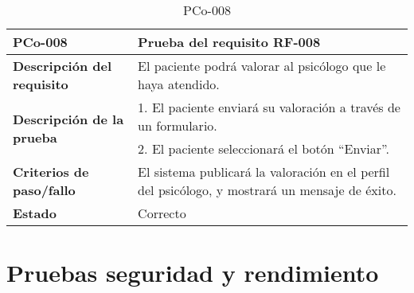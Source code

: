 \begin{table}[htpb]
\centering
\begin{tabularx}{\textwidth}{|l|X|}
\hline
\rowcolor[gray]{0.9}\textbf{PCo-008}                                     & \textbf{Prueba del requisito RF-008}                                                           \\ \hline
\textbf{Descripción del requisito}                 & El paciente podrá valorar al psicólogo que le haya atendido.                                   \\ \hline
\multirow{2}{*}{\textbf{Descripción de la prueba}} & 1. El paciente enviará su valoración a través de un formulario.                                \\ \cline{2-2} 
                                                   & 2. El paciente seleccionará el botón ``Enviar''.
\\ \hline
\textbf{Criterios de paso/fallo}                   & El sistema publicará la valoración en el perfil del psicólogo, y mostrará un mensaje de éxito. \\ \hline
\textbf{Estado}                                    & Correcto                                                                                       \\ \hline
\end{tabularx}
\caption{PCo-008}
\end{table}

\section{Pruebas seguridad y rendimiento}


%
%
%
%
%


